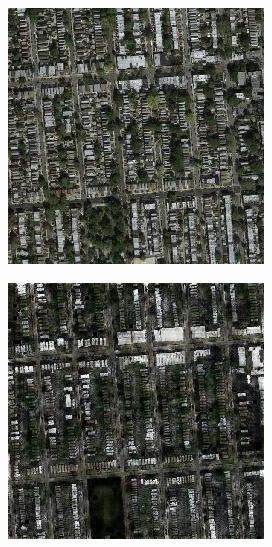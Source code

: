 \begin{figure}
  \medskip

  \begin{subfigure}[t]{.2\textwidth}
    \centering
    \includegraphics[width=\linewidth]{images/cycleGanResults/Satelite10_Or_Ld120_E100_Lr0002.jpg}
  \end{subfigure}
  \begin{subfigure}[t]{.2\textwidth}
    \centering
    \includegraphics[width=\linewidth]{images/cycleGanResults/Satelite10_Ld120_E100_Lr0002.jpg}

\end{subfigure}
\end{figure}
